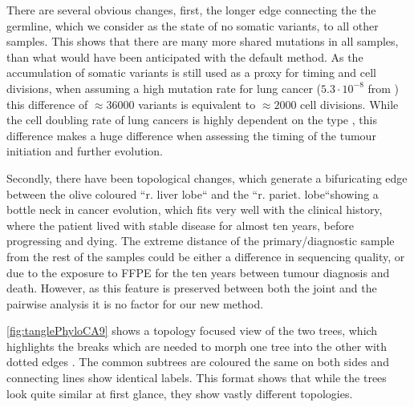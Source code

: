 There are several obvious changes, first, the longer edge connecting the the germline, which we consider as the state of no somatic variants, to all other samples. This shows that there are many more shared mutations in all samples, than what would have been anticipated with the default method. As the accumulation of somatic variants is still used as a proxy for timing and cell divisions, when assuming a high mutation rate for lung cancer ($5.3 \cdot 10^{-8}$ from \citeauthor*{Werner2020} \cite{Werner2020}) this difference of $\approx 36000$ variants is equivalent to $\approx 2000$ cell divisions. While the cell doubling rate of lung cancers is highly dependent on the type \cite{Arai1994}, this difference makes a huge difference when assessing the timing of the tumour initiation and further evolution. 

Secondly, there have been topological changes, which generate a bifuricating edge between the olive coloured ``r. liver lobe`` and the ``r. pariet. lobe``showing a bottle neck in cancer evolution, which fits very well with the clinical history, where the patient lived with stable disease for almost ten years, before progressing and dying. The extreme distance of the primary/diagnostic sample from the rest of the samples could be either a difference in sequencing quality, or due to the exposure to FFPE for the ten years between tumour diagnosis and death. However, as this feature is preserved between both the joint and the pairwise analysis it is no factor for our new method.

\autoref{fig:tanglePhyloCA9} shows a topology focused view of the two trees, which highlights the breaks which are needed to morph one tree into the other with dotted edges \cite{Vienne2018}. The common subtrees are coloured the same on both sides and connecting lines show identical labels. This format shows that while the trees look quite similar at first glance, they show vastly different topologies.

